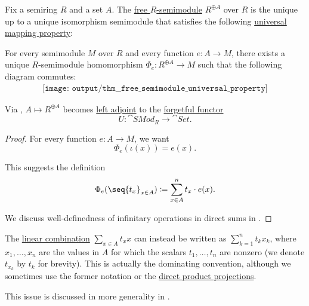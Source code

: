 \begin{theorem}\label{thm:free_semimodule_universal_property}
  Fix a semiring \( R \) and a set \( A \). The \hyperref[def:free_semimodule]{free \( R \)-semimodule} \( R^{\oplus A} \) over \( R \) is the unique up to a unique isomorphism semimodule that satisfies the following \hyperref[rem:universal_mapping_property]{universal mapping property}:
  \begin{displayquote}
    For every semimodule \( M \) over \( R \) and every function \( e: A \to M \), there exists a unique \( R \)-semimodule homomorphism \( \Phi_e: R^{\oplus A} \to M \) such that the following diagram commutes:
    \begin{equation}\label{eq:thm:free_semimodule_universal_property/diagram}
      \begin{aligned}
        \texttt{[image: output/thm\_\_free\_semimodule\_universal\_property]}
      \end{aligned}
    \end{equation}
  \end{displayquote}
\end{theorem}
\begin{comments}
  \item Via , \( A \mapsto R^{\oplus A} \) becomes \hyperref[def:category_adjunction]{left adjoint} to the \hyperref[def:concrete_category]{forgetful functor}
  \begin{equation*}
    U: \cat{SMod}_R \to \cat{Set}.
  \end{equation*}
\end{comments}
\begin{proof}
  For every function \( e: A \to M \), we want
  \begin{equation*}
    \Phi_e(\iota(x)) = e(x).
  \end{equation*}

  This suggests the definition
  \begin{equation*}
    \Phi_e(\seq{ t_x }_{x \in A}) \coloneqq \sum_{x \in A}^n t_x \cdot e(x).
  \end{equation*}

  We discuss well-definedness of infinitary operations in direct sums in .
\end{proof}

\begin{remark}\label{rem:linear_combinations}
  The \hyperref[def:free_semimodule]{linear combination} \( \sum_{x \in A} t_x x \) can instead be written as \( \sum_{k=1}^n t_k x_k \), where \( x_1, \ldots, x_n \) are the values in \( A \) for which the scalars \( t_1, \ldots, t_n \) are nonzero (we denote \( t_{x_k} \) by \( t_k \) for brevity). This is actually the dominating convention, although we sometimes use the former notation or the \hyperref[thm:direct_product_projections]{direct product projections}.

  This issue is discussed in more generality in .
\end{remark}


